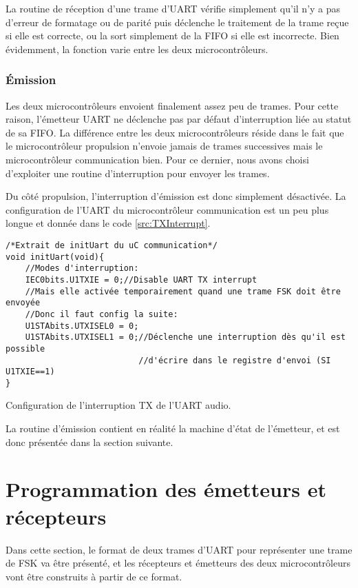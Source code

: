 La routine de réception d'une trame d'UART vérifie simplement qu'il n'y a pas d'erreur de formatage ou de parité puis déclenche le traitement de la trame reçue si elle est correcte, ou la sort simplement de la FIFO si elle est incorrecte. Bien évidemment, la fonction  varie entre les deux microcontrôleurs.

\subsubsection{\'Emission}
Les deux microcontrôleurs envoient finalement assez peu de trames. Pour cette raison, l'émetteur UART ne déclenche pas par défaut d'interruption liée au statut de sa FIFO. La différence entre les deux microcontrôleurs réside dans le fait que le microcontrôleur propulsion n'envoie jamais de trames successives mais le microcontrôleur communication bien. Pour ce dernier, nous avons choisi d'exploiter une routine d'interruption pour envoyer les trames.

Du côté propulsion, l'interruption d'émission est donc simplement désactivée. La configuration de l'UART du microcontrôleur communication est un peu plus longue et donnée dans le code \ref{src:TXInterrupt}.
\begin{listing}[htbp]
\begin{verbatim}
/*Extrait de initUart du uC communication*/
void initUart(void){
    //Modes d'interruption:
    IEC0bits.U1TXIE = 0;//Disable UART TX interrupt
    //Mais elle activée temporairement quand une trame FSK doit être envoyée
    //Donc il faut config la suite:
    U1STAbits.UTXISEL0 = 0;
    U1STAbits.UTXISEL1 = 0;//Déclenche une interruption dès qu'il est possible
                           //d'écrire dans le registre d'envoi (SI U1TXIE==1)
}
\end{verbatim}
\caption{Configuration de l'interruption TX de l'UART audio.\label{src:TXInterrupt}}
\end{listing}
La routine d'émission contient en réalité la machine d'état de l'émetteur, et est donc présentée dans la section suivante.

\section{Programmation des émetteurs et récepteurs}
Dans cette section, le format de deux trames d'UART pour représenter une trame de FSK va être présenté, et les récepteurs et émetteurs des deux microcontrôleurs vont être construits à partir de ce format.

